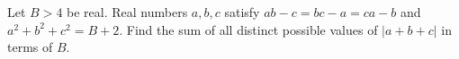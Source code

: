 Let $B>4$ be real. Real numbers $a,b,c$ satisfy $ab-c=bc-a=ca-b$ and $a^2+b^2+c^2=B+2$. Find the sum of all distinct possible values of $|a+b+c|$ in terms of $B$.
